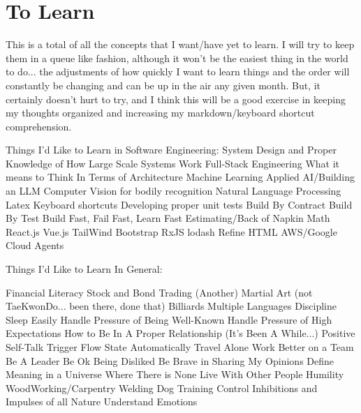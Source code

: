 \documentclass{article}
\begin{document}
\section*{To Learn}
This is a total of all the concepts that I want/have yet to learn. I will try to keep them in a queue like fashion, although it won't be the easiest thing in the world to do... the adjustments of how quickly I want to learn things and the order will constantly be changing and can be up in the air any given month. But, it certainly doesn't hurt to try, and I think this will be a good exercise in keeping my thoughts organized and increasing my markdown/keyboard shortcut comprehension.

Things I'd Like to Learn in Software Engineering:
System Design and Proper Knowledge of How Large Scale Systems Work
Full-Stack Engineering
What it means to Think In Terms of Architecture
Machine Learning
Applied AI/Building an LLM
Computer Vision for bodily recognition
Natural Language Processing
Latex
Keyboard shortcuts
Developing proper unit tests
Build By Contract
Build By Test
Build Fast, Fail Fast, Learn Fast
Estimating/Back of Napkin Math
React.js
Vue.js
TailWind
Bootstrap
RxJS
lodash
Refine HTML
AWS/Google Cloud
Agents


Things I'd Like to Learn In General:

Financial Literacy
Stock and Bond Trading
(Another) Martial Art (not TaeKwonDo... been there, done that)
Billiards
Multiple Languages
Discipline
Sleep Easily
Handle Pressure of Being Well-Known
Handle Pressure of High Expectations
How to Be In A Proper Relationship (It's Been A While...)
Positive Self-Talk
Trigger Flow State Automatically
Travel Alone
Work Better on a Team
Be A Leader
Be Ok Being Disliked
Be Brave in Sharing My Opinions
Define Meaning in a Universe Where There is None
Live With Other People
Humility
WoodWorking/Carpentry
Welding
Dog Training
Control Inhibitions and Impulses of all Nature
Understand Emotions 
\end{document}
